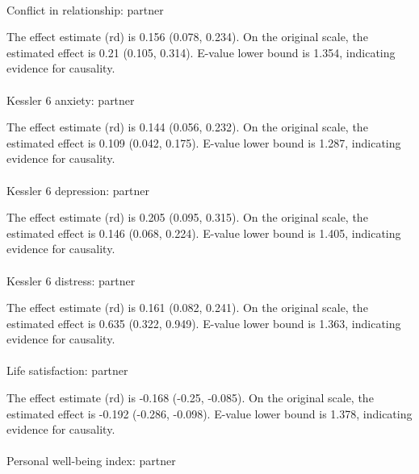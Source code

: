 \documentclass[
  single column]{article}
\makeatletter
\let\oldparagraph\paragraph
\renewcommand{\paragraph}{
    \@ifstar
      \xxxParagraphStar
      \xxxParagraphNoStar
  }
\newcommand{\xxxParagraphStar}[1]{\oldparagraph*{#1}\mbox{}}
\newcommand{\xxxParagraphNoStar}[1]{\oldparagraph{#1}\mbox{}}
\makeatother
\begin{document}
\paragraph{Conflict in relationship:
partner}\label{conflict-in-relationship-partner-2}

The effect estimate (rd) is 0.156 (0.078, 0.234). On the original scale,
the estimated effect is 0.21 (0.105, 0.314). E-value lower bound is
1.354, indicating evidence for causality.

\paragraph{Kessler 6 anxiety:
partner}\label{kessler-6-anxiety-partner-1}

The effect estimate (rd) is 0.144 (0.056, 0.232). On the original scale,
the estimated effect is 0.109 (0.042, 0.175). E-value lower bound is
1.287, indicating evidence for causality.

\paragraph{Kessler 6 depression:
partner}\label{kessler-6-depression-partner}

The effect estimate (rd) is 0.205 (0.095, 0.315). On the original scale,
the estimated effect is 0.146 (0.068, 0.224). E-value lower bound is
1.405, indicating evidence for causality.

\paragraph{Kessler 6 distress:
partner}\label{kessler-6-distress-partner-2}

The effect estimate (rd) is 0.161 (0.082, 0.241). On the original scale,
the estimated effect is 0.635 (0.322, 0.949). E-value lower bound is
1.363, indicating evidence for causality.

\paragraph{Life satisfaction:
partner}\label{life-satisfaction-partner-2}

The effect estimate (rd) is -0.168 (-0.25, -0.085). On the original
scale, the estimated effect is -0.192 (-0.286, -0.098). E-value lower
bound is 1.378, indicating evidence for causality.

\paragraph{Personal well-being index:
partner}\label{personal-well-being-index-partner-2}
\end{document}

